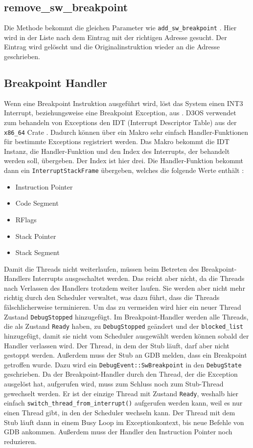 \subsection{remove\_sw\_breakpoint}
Die Methode bekommt die gleichen Parameter wie \texttt{add\_sw\_breakpoint} \cite{gdbstub}. Hier wird in der Liste nach dem Eintrag mit der richtigen Adresse gesucht. Der Eintrag wird gelöscht und die Originalinstruktion wieder an die Adresse geschrieben.

\subsection{Breakpoint Handler}
Wenn eine Breakpoint Instruktion ausgeführt wird, löst das System einen INT3 Interrupt, beziehungsweise eine Breakpoint Exception, aus \cite{intel-sdm}. D3OS verwendet zum behandeln von Exceptions den IDT (Interrupt Descriptor Table) aus der \texttt{x86\_64} Crate \cite{x86-64}. Dadurch können über ein Makro sehr einfach Handler-Funktionen für bestimmte Exceptions registriert werden. Das Makro bekommt die IDT Instanz, die Handler-Funktion und den Index des Interrupts, der behandelt werden soll, übergeben. Der Index ist hier drei. Die Handler-Funktion bekommt dann ein \texttt{InterruptStackFrame} übergeben, welches die folgende Werte enthält \cite{x86-64}:

\begin{itemize}
\item Instruction Pointer
\item Code Segment
\item RFlags
\item Stack Pointer
\item Stack Segment
\end{itemize}

Damit die Threads nicht weiterlaufen, müssen beim Betreten des Breakpoint-Handlers Interrupts ausgeschaltet werden. Das reicht aber nicht, da die Threads nach Verlassen des Handlers trotzdem weiter laufen. Sie werden aber nicht mehr richtig durch den Scheduler verwaltet, was dazu führt, dass die Threads fälschlicherweise terminieren. Um das zu vermeiden wird hier ein neuer Thread Zustand \texttt{DebugStopped} hinzugefügt. Im Breakpoint-Handler werden alle Threads, die als Zustand \texttt{Ready} haben, zu \texttt{DebugStopped} geändert und der \texttt{blocked\_list} hinzugefügt, damit sie nicht vom Scheduler ausgewählt werden können sobald der Handler verlassen wird. Der Thread, in dem der Stub läuft, darf aber nicht gestoppt werden. Außerdem muss der Stub an GDB melden, dass ein Breakpoint getroffen wurde. Dazu wird ein \texttt{DebugEvent::SwBreakpoint} in den \texttt{DebugState} geschrieben. Da der Breakpoint-Handler durch den Thread, der die Exception ausgelöst hat, aufgerufen wird, muss zum Schluss noch zum Stub-Thread gewechselt werden. Er ist der einzige Thread mit Zustand \texttt{Ready}, weshalb hier einfach \texttt{switch\_thread\_from\_interrupt()} aufgerufen werden kann, weil es nur einen Thread gibt, in den der Scheduler wechseln kann. Der Thread mit dem Stub läuft dann in einem  Busy Loop im Exceptionkontext, bis neue Befehle von GDB ankommen. Außerdem muss der Handler den Instruction Pointer noch reduzieren.


